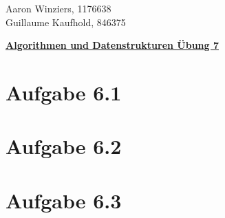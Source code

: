 \documentclass[10pt,a4paper]{article}
\begin{document}
	\begin{flushright}
		Aaron Winziers, 1176638	\\
		Guillaume Kaufhold, 846375
	\end{flushright}
	\begin{center}
		\underline{\textbf{Algorithmen und Datenstrukturen Übung 7}}
	\end{center}
	\section*{Aufgabe 6.1}		
	
	\section*{Aufgabe 6.2}
	

	\section*{Aufgabe 6.3}
\end{document}
